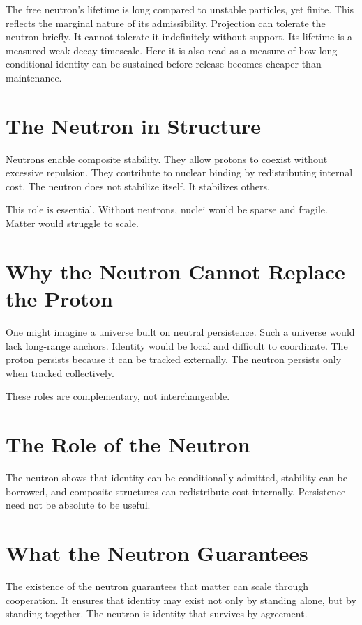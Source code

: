 \documentclass[11pt,twoside,openright]{book}
\begin{document}
The free neutron's lifetime is long compared to unstable particles, yet finite. This reflects the marginal nature of its admissibility. Projection can tolerate the neutron briefly. It cannot tolerate it indefinitely without support. Its lifetime is a measured weak-decay timescale. Here it is also read as a measure of how long conditional identity can be sustained before release becomes cheaper than maintenance.

\section*{The Neutron in Structure}

Neutrons enable composite stability. They allow protons to coexist without excessive repulsion. They contribute to nuclear binding by redistributing internal cost. The neutron does not stabilize itself. It stabilizes others.

This role is essential. Without neutrons, nuclei would be sparse and fragile. Matter would struggle to scale.

\section*{Why the Neutron Cannot Replace the Proton}

One might imagine a universe built on neutral persistence. Such a universe would lack long-range anchors. Identity would be local and difficult to coordinate. The proton persists because it can be tracked externally. The neutron persists only when tracked collectively.

These roles are complementary, not interchangeable.

\section*{The Role of the Neutron}

The neutron shows that identity can be conditionally admitted, stability can be borrowed, and composite structures can redistribute cost internally. Persistence need not be absolute to be useful.

\section*{What the Neutron Guarantees}

The existence of the neutron guarantees that matter can scale through cooperation. It ensures that identity may exist not only by standing alone, but by standing together. The neutron is identity that survives by agreement.
\end{document}
